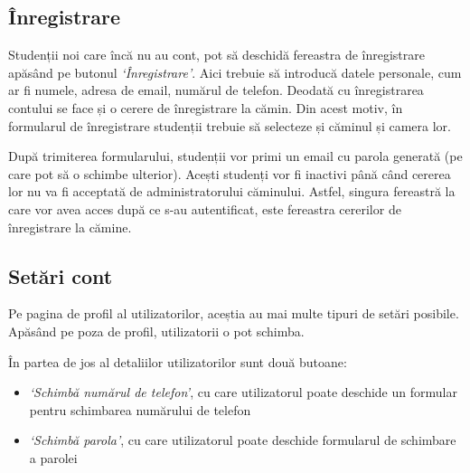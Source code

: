 \documentclass[12pt,a4paper]{report}
\theoremstyle{definition}
\theoremstyle{remark}
\begin{document}

\subsection{Înregistrare}

\par Studenții noi care încă nu au cont, pot să deschidă fereastra de înregistrare apăsând pe butonul \textit{`Înregistrare'}. Aici trebuie să introducă datele personale, cum ar fi numele, adresa de email, numărul de telefon. Deodată cu înregistrarea contului se face și o cerere de înregistrare la cămin. Din acest motiv, în formularul de înregistrare studenții trebuie să selecteze și căminul și camera lor.


\par După trimiterea formularului, studenții vor primi un email cu parola generată (pe care pot să o schimbe ulterior). Acești studenți vor fi inactivi până când cererea lor nu va fi acceptată de administratorului căminului. Astfel, singura fereastră la care vor avea acces după ce s-au autentificat, este fereastra cererilor de înregistrare la cămine.

\subsection{Setări cont}

\par Pe pagina de profil al utilizatorilor, aceștia au mai multe tipuri de setări posibile. Apăsând pe poza de profil, utilizatorii o pot schimba.


\par În partea de jos al detaliilor utilizatorilor sunt două butoane:
\begin{itemize}
    \item \textit{`Schimbă numărul de telefon'}, cu care utilizatorul poate deschide un formular pentru schimbarea numărului de telefon
    \item \textit{`Schimbă parola'}, cu care utilizatorul poate deschide formularul de schimbare a parolei
\end{itemize}

\end{document}
